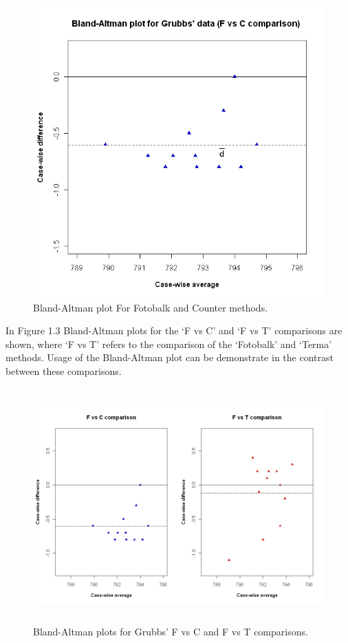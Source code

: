 \documentclass[12pt, a4paper]{report}
\begin{document}
	\begin{figure}[h!]
		\begin{center}
			\includegraphics[width=120mm]{images/GrubbsBAplot-noLOA.jpeg}
			\caption{Bland-Altman plot For Fotobalk and Counter methods.}\label{GrubbsBA-noLOA}
		\end{center}
	\end{figure}
	
	
	
	In Figure 1.3 Bland-Altman plots for the `F vs C' and `F vs T'
	comparisons are shown, where `F vs T' refers to the comparison of
	the `Fotobalk' and `Terma' methods. Usage of the Bland-Altman plot
	can be demonstrate in the contrast between these comparisons.
	
	\begin{figure}[h!]
		\begin{center}
			\includegraphics[height=90mm]{images/GrubbsDataTwoBAplots.jpeg}
			\caption{Bland-Altman plots for Grubbs' F vs C and F vs T comparisons.}\label{GrubbsDataTwoBAplots}
		\end{center}
	\end{figure}
	
\end{document}
